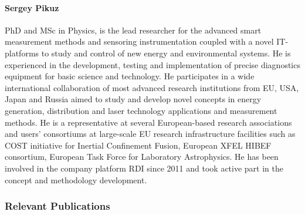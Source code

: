 \documentclass[a4paper,11pt]{article}
\begin{document}
\paragraph{Sergey Pikuz} PhD and MSc in Physics, is the lead researcher for the advanced smart measurement methods and sensoring instrumentation coupled with a novel IT-platforms to study and control of new energy and environmental systems. He is experienced in the development, testing and implementation of precise diagnostics equipment for basic science and technology. He participates in a wide international collaboration of most advanced research institutions from EU, USA, Japan and Russia aimed to study and develop novel concepts in energy generation, distribution and laser technology applications and measurement methods. He is a representative at several European-based research associations and users' consortiums at large-scale EU research infrastructure facilities such as COST initiative for Inertial Confinement Fusion, European XFEL HIBEF consortium, European Task Force for Laboratory Astrophysics. He has been involved in the company platform RDI since 2011 and took active part in the concept and methodology development.

\pagebreak
\subsubsection*{Relevant Publications}
\end{document}
